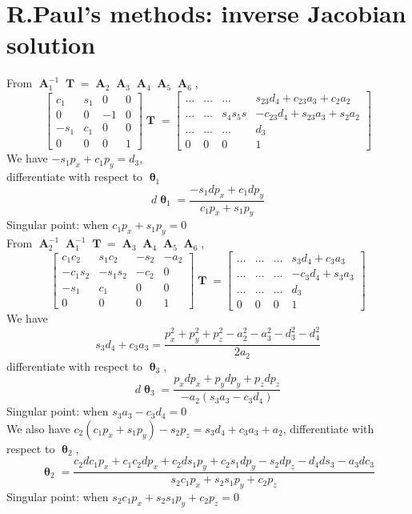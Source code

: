 \documentclass[12pt]{article}
\DeclareMathOperator{\A}{\mathbf{A}}
\DeclareMathOperator{\T}{\mathbf{T}}
\DeclareMathOperator{\Th}{\mathbf{\theta}}
\begin{document}
\section{R.Paul's methods: inverse Jacobian solution}
From $\A_1^{-1}\T = \A_2\A_3\A_4\A_5\A_6$,
$$\begin{bmatrix}
    c_1 & s_1 & 0 & 0\\
    0 & 0 & -1 & 0\\
    -s_1 & c_1 & 0 & 0\\
    0 & 0 & 0 & 1
  \end{bmatrix} \T =
  \begin{bmatrix}
    \dots & \dots & \dots & s_{23}d_4+c_{23}a_3+c_2a_2\\
    \dots & \dots & s_4s_5s & -c_{23}d_4+s_{23}a_3+s_2a_2\\
    \dots & \dots & \dots & d_3\\
    0 & 0 & 0 & 1
  \end{bmatrix}$$
We have $-s_1p_x+c_1p_y = d_3$,\\
differentiate with respect to $\Th_1$
$$d\Th_1 = \frac{-s_1dp_x+c_1dp_y}{c_1p_x+s_1p_y}$$
Singular point: when $c_1p_x+s_1p_y = 0$\\
From $\A_2^{-1}\A_1^{-1}\T = \A_3\A_4\A_5\A_6$,
$$\begin{bmatrix}
    c_1c_2 & s_1c_2 & -s_2 & -a_2\\
    -c_1s_2 & -s_1s_2 & -c_2 & 0\\
    -s_1 & c_1 & 0 & 0\\
    0 & 0 & 0 & 1
  \end{bmatrix} \T =
  \begin{bmatrix}
    \dots & \dots & \dots & s_3d_4+c_3a_3\\
    \dots & \dots & \dots & -c_3d_4+s_3a_3\\
    \dots & \dots & \dots & d_3\\
    0 & 0 & 0 & 1
  \end{bmatrix}$$
We have $$s_3d_4+c_3a_3 = \frac{p_x^2+p_y^2+p_z^2-a_2^2-a_3^2-d_3^2-d_4^2}{2a_2}$$
differentiate with respect to $\Th_3$,
$$d\Th_3 = \frac{p_xdp_x+p_ydp_y+p_zdp_z}{-a_2(s_3a_3-c_3d_4)}$$
Singular point: when $s_3a_3-c_3d_4 = 0$\\
We also have $c_2(c_1p_x+s_1p_y) - s_2p_z = s_3d_4 + c_3a_3 + a_2$,
differentiate with respect to $\Th_2$,
$$\Th_2 = \frac{c_2dc_1p_x+c_1c_2dp_x+c_2ds_1p_y+c_2s_1dp_y-s_2dp_z-d_4ds_3-a_3dc_3}{s_2c_1p_x+s_2s_1p_y+c_2p_z}$$
Singular point: when $s_2c_1p_x+s_2s_1p_y+c_2p_z = 0$\\
\end{document}
